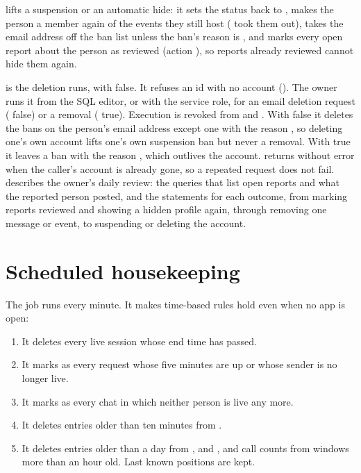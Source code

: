  lifts a suspension or an automatic hide: it sets the status back to
, makes the person a member again of the events they still host ( took
them out), takes the email address off the ban list unless the ban's reason is , and marks every open report about the person
as reviewed (action ), so reports already reviewed cannot hide them again.

 is the deletion  runs, with 
false. It refuses an id with no account (). The owner runs it from the SQL editor, or
with the service role, for an email deletion request ( false) or a removal (
true). Execution is revoked from  and . With  false it deletes
the bans on the person's email address except one with the reason , so deleting one's own
account lifts one's own suspension ban but never a removal. With  true it leaves a ban with
the reason , which outlives the account.  returns without error when the
caller's account is already gone, so a repeated request does not fail.  describes
the owner's daily review: the queries that list open reports and what the reported person posted, and
the statements for each outcome, from marking reports reviewed and showing a hidden profile again, through
removing one message or event, to suspending or deleting the account.

\section{Scheduled housekeeping}
\label{sec:housekeeping}

The  job  runs  every minute. It makes
time-based rules hold even when no app is open:

\begin{enumerate}
  \item It deletes every live session whose end time has passed.
  \item It marks as  every  request whose five minutes are up or whose sender
    is no longer live.
  \item It marks as  every  chat in which neither person is live any more.
  \item It deletes entries older than ten minutes from .
  \item It deletes entries older than a day from ,
     and , and call counts from windows more than an
    hour old. Last known positions are kept.
\end{enumerate}

